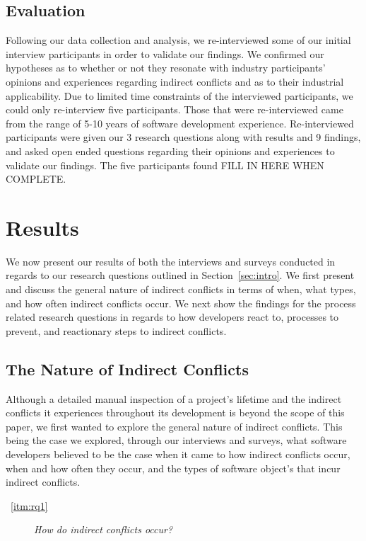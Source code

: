 \documentclass[conference]{IEEEtran}
\begin{document}
\subsection{Evaluation}

Following our data collection and analysis, we re-interviewed some of our initial interview participants
in order to validate our findings. We confirmed our hypotheses as to whether or not they resonate with 
industry participants' opinions and experiences regarding indirect conflicts and as to their industrial 
applicability. Due to limited time constraints of the interviewed participants, we could only re-interview
five participants. Those that were re-interviewed came from the range of 5-10 years of software development
experience. Re-interviewed participants were given our 3 research questions along with results and 9 findings,
and asked open ended questions regarding their opinions and experiences to validate our findings. The five
participants found FILL IN HERE WHEN COMPLETE.

\section{Results}
\label{sec:results}

We now present our results of both the interviews and surveys conducted in regards to our research questions
outlined in Section~\ref{sec:intro}. We first present and discuss the general nature of indirect conflicts in
terms of when, what types, and how often indirect conflicts occur. We next show the findings for the process
related research questions in regards to how developers react to, processes to prevent, and reactionary steps
to indirect conflicts.

\subsection{The Nature of Indirect Conflicts}

Although a detailed manual inspection of a project's lifetime and the indirect conflicts it experiences throughout
its development is beyond the scope of this paper, we first wanted to explore the general nature of indirect 
conflicts. This being the case we explored, through our interviews and surveys, what software developers believed
to be the case when it came to how indirect conflicts occur, when and how often they occur, and the types of 
software object's that incur indirect conflicts.

\begin{description}
	\item[~\ref{itm:rq1}] \textit{How do indirect conflicts occur?}
\end{description}
\end{document}
